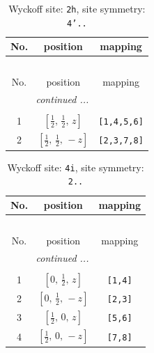 \documentclass[fleqn,8pt]{jsarticle}
\begin{document}
\begin{longtable}{ccc}
\caption{Wyckoff site: {\tt 2h}, site symmetry: {\tt 4'..}}
 \\
 \hline \hline
No. & position & mapping \\ \hline \endfirsthead

\multicolumn{2}{l}{\tablename\ \thetable{}} \\
 \hline \hline
No. & position & mapping \\ \hline \endhead

 \hline \hline
\multicolumn{2}{r}{\footnotesize\it continued ...} \\ \endfoot

 \hline \hline
\multicolumn{2}{r}{} \\ \endlastfoot

1 & $\left[ \frac{1}{2},\, \frac{1}{2},\, z \right]$ & {\tt [1,4,5,6]} \\ \hline
2 & $\left[ \frac{1}{2},\, \frac{1}{2},\, - z \right]$ & {\tt [2,3,7,8]} \\
\end{longtable}
\renewcommand{\arraystretch}{1.2}
\begin{longtable}{ccc}
\caption{Wyckoff site: {\tt 4i}, site symmetry: {\tt 2..}}
 \\
 \hline \hline
No. & position & mapping \\ \hline \endfirsthead

\multicolumn{2}{l}{\tablename\ \thetable{}} \\
 \hline \hline
No. & position & mapping \\ \hline \endhead

 \hline \hline
\multicolumn{2}{r}{\footnotesize\it continued ...} \\ \endfoot

 \hline \hline
\multicolumn{2}{r}{} \\ \endlastfoot

1 & $\left[ 0,\, \frac{1}{2},\, z \right]$ & {\tt [1,4]} \\ \hline
2 & $\left[ 0,\, \frac{1}{2},\, - z \right]$ & {\tt [2,3]} \\ \hline
3 & $\left[ \frac{1}{2},\, 0,\, z \right]$ & {\tt [5,6]} \\ \hline
4 & $\left[ \frac{1}{2},\, 0,\, - z \right]$ & {\tt [7,8]} \\
\end{longtable}
\renewcommand{\arraystretch}{1.2}
\end{document}
